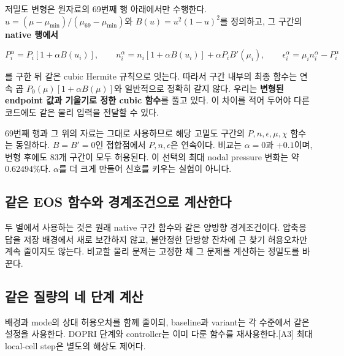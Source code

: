 \documentclass[
  10pt,
  a4paper,
]{article}
\begin{document}
저밀도 변형은 원자료의 69번째 행 아래에서만 수행한다.
\(u=(\mu-\mu_{\min})/(\mu_{69}-\mu_{\min})\)와 \(B(u)=u^2(1-u)^2\)를
정의하고, 그 구간의 \textbf{native 행에서}

\[
P_i^\alpha=P_i[1+\alpha B(u_i)],\qquad
n_i^\alpha=n_i[1+\alpha B(u_i)]+\alpha P_i B'(\mu_i),\qquad
\epsilon_i^\alpha=\mu_i n_i^\alpha-P_i^\alpha
\]

를 구한 뒤 같은 cubic Hermite 규칙으로 잇는다. 따라서 구간 내부의 최종
함수는 연속 곱 \(P_0(\mu)[1+\alpha B(\mu)]\)와 일반적으로 정확히 같지
않다. 우리는 \textbf{변형된 endpoint 값과 기울기로 정한 cubic 함수}를
풀고 있다. 이 차이를 적어 두어야 다른 코드에도 같은 물리 입력을 전달할
수 있다.

69번째 행과 그 위의 자료는 그대로 사용하므로 해당 고밀도 구간의
\(P,n,\epsilon,\mu,\chi\) 함수는 동일하다. \(B=B'=0\)인 접합점에서
\(P,n,\epsilon\)은 연속이다. 비교는 \(\alpha=0\)과 \(+0.1\)이며, 변형
후에도 83개 구간이 모두 허용된다. 이 선택의 최대 nodal pressure 변화는
약 \(0.62494\%\)다. \(\alpha\)를 더 크게 만들어 신호를 키우는 실험이
아니다.

\subsection{같은 EOS 함수와 경계조건으로
계산한다}\label{uxac19uxc740-eos-uxd568uxc218uxc640-uxacbduxacc4uxc870uxac74uxc73cuxb85c-uxacc4uxc0b0uxd55cuxb2e4}

두 별에서 사용하는 것은 원래 native 구간 함수와 같은 양방향
경계조건이다. 압축응답을 저장 배경에서 새로 보간하지 않고, 불안정한
단방향 잔차에 근 찾기 허용오차만 계속 줄이지도 않는다. 비교할 물리
문제는 고정한 채 그 문제를 계산하는 정밀도를 바꾼다.

\subsection{같은 질량의 네 단계
계산}\label{uxac19uxc740-uxc9c8uxb7c9uxc758-uxb124-uxb2e8uxacc4-uxacc4uxc0b0}

배경과 mode의 상대 허용오차를 함께 줄이되, baseline과 variant는 각
수준에서 같은 설정을 사용한다. DOPRI 단계와 controller는 이미 다룬
함수를 재사용한다.{[}A3{]} 최대 local-cell step은 별도의 해상도 제어다.
\end{document}
